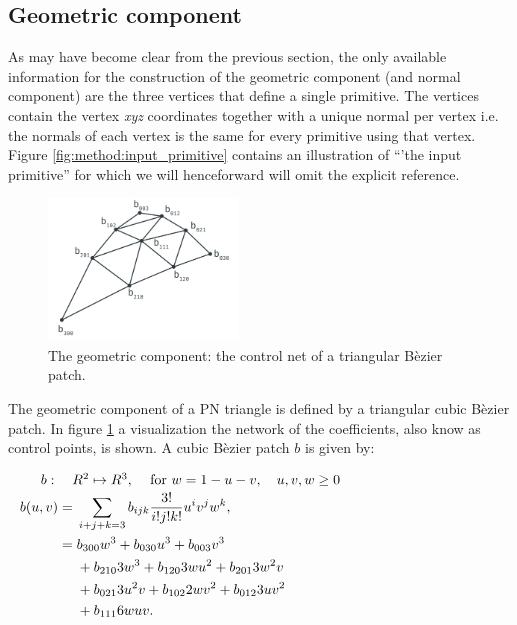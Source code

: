 
\subsection{Geometric component}
\label{ss:geometric_component}

As may have become clear from the previous section, the only available information for the construction of the geometric component (and normal component) are the three vertices that define a single primitive. The vertices contain the vertex \textit{xyz} coordinates together with a unique normal per vertex i.e. the normals of each vertex is the same for every primitive using that vertex. Figure \ref{fig:method:input_primitive} contains an illustration of ``'the input primitive'' for which we will henceforward will omit the explicit reference. 

\begin{figure}
	\centering
	\includegraphics[width=0.45\textwidth]{./content/img/method/geometry.png}
	\caption{The geometric component: the control net of a triangular B\`ezier patch.}
	\label{fig:method:control_net}
\end{figure}

The geometric component of a PN triangle is defined by a triangular cubic B\`ezier patch. In figure \ref{fig:method:control_net} a visualization the network of the coefficients, also know as control points, is shown. A cubic B\`ezier patch $b$ is given by:

\begin{align}
\noalign{$b: \quad R^2 \mapsto R^3,\quad$ for $w = 1 - u - v, \quad u, v, w \geq 0$}
\begin{split}\label{eq:method:cubic_bezier_patch}
    b(u,v) ={}& \sum_{i + j + k = 3} b_{ijk}\frac{3!}{i!j!k!} u^i v^j w^k,\\
      	   ={}& b_{300}w^3 + b_{030}u^3 + b_{003}v^3\\
      	    {}& + b_{210}3w^3 + b_{120}3wu^2 + b_{201}3w^2v\\
      	    {}& + b_{021}3u^2v + b_{102}2wv^2 + b_{012}3uv^2\\
      	    {}& + b_{111}6wuv.
\end{split}
\end{align}

